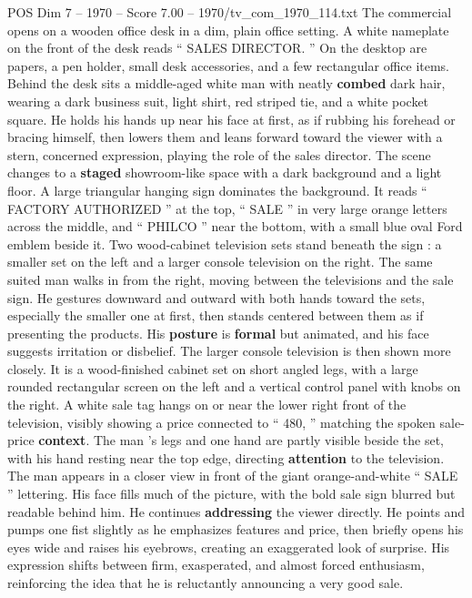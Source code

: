 \begin{textsample}{POS Dim 7 – 1970 – Score 7.00 – 1970/tv\_com\_1970\_114.txt}  \label{ex:f7_pos_035}
The commercial opens on a wooden office desk in a dim, plain office setting.
A white nameplate on the front of the desk reads “ SALES DIRECTOR. ” On the desktop are papers, a pen holder, small desk accessories, and a few rectangular office items.
Behind the desk sits a middle-aged white man with neatly \textbf{combed} dark hair, wearing a dark business suit, light shirt, red striped tie, and a white pocket square.
He holds his hands up near his face at first, as if rubbing his forehead or bracing himself, then lowers them and leans forward toward the viewer with a stern, concerned expression, playing the role of the sales director.
The scene changes to a \textbf{staged} showroom-like space with a dark background and a light floor.
A large triangular hanging sign dominates the background.
It reads “ FACTORY AUTHORIZED ” at the top, “ SALE ” in very large orange letters across the middle, and “ PHILCO ” near the bottom, with a small blue oval Ford emblem beside it.
Two wood-cabinet television sets stand beneath the sign : a smaller set on the left and a larger console television on the right.
The same suited man walks in from the right, moving between the televisions and the sale sign.
He gestures downward and outward with both hands toward the sets, especially the smaller one at first, then stands centered between them as if presenting the products.
His \textbf{posture} is \textbf{formal} but animated, and his face suggests irritation or disbelief.
The larger console television is then shown more closely.
It is a wood-finished cabinet set on short angled legs, with a large rounded rectangular screen on the left and a vertical control panel with knobs on the right.
A white sale tag hangs on or near the lower right front of the television, visibly showing a price connected to “ 480, ” matching the spoken sale-price \textbf{context}.
The man ’s legs and one hand are partly visible beside the set, with his hand resting near the top edge, directing \textbf{attention} to the television.
The man appears in a closer view in front of the giant orange-and-white “ SALE ” lettering.
His face fills much of the picture, with the bold sale sign blurred but readable behind him.
He continues \textbf{addressing} the viewer directly.
He points and pumps one fist slightly as he emphasizes features and price, then briefly opens his eyes wide and raises his eyebrows, creating an exaggerated look of surprise.
His expression shifts between firm, exasperated, and almost forced enthusiasm, reinforcing the idea that he is reluctantly announcing a very good sale.

\end{textsample}
